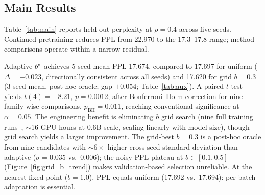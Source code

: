 \begin{table}[t]
\centering
\small
\setlength{\tabcolsep}{3pt}
\caption{Main comparison: held-out PPL ($\downarrow$) at $\rho{=}0.4$, 1 content epoch.
Adaptive and Uniform: 5-seed means (seeds 42, 123, 456, 789, 234); ESS-only and Random: 3-seed means (seeds 42, 123, 456); Permuted: single seed (42).
Adaptive uses $\tau{=}0.7$, $\nmin{=}2$.
Permuted randomly shuffles $q$-scores across samples, destroying provenance signal while preserving weight non-uniformity ($\Delta{=}{+}0.225$).}
\label{tab:main}
\end{table}

\subsection{Main Results}
\label{sec:main-results}

Table~\ref{tab:main} reports held-out perplexity at $\rho = 0.4$ across five seeds.
Continued pretraining reduces PPL from 22.970 to the 17.3--17.8 range; method comparisons operate within a narrow residual.

Adaptive $b^*$ achieves 5-seed mean PPL 17.674, compared to 17.697 for uniform ($\Delta{=}{-}0.023$, directionally consistent across all seeds) and 17.620 for grid $b{=}0.3$ (3-seed mean, post-hoc oracle; gap $+$0.054; Table~\ref{tab:aux}).
A paired $t$-test yields $t(4){=}{-}8.21$, $p{=}0.0012$; after Bonferroni--Holm correction for nine family-wise comparisons, $p_{\mathrm{BH}}{=}0.011$, reaching conventional significance at $\alpha{=}0.05$.
The engineering benefit is eliminating $b$ grid search (nine full training runs~\citep{drayson2025detection}, ${\sim}$16 GPU-hours at 0.6B scale, scaling linearly with model size), though grid search yields a larger improvement.
The grid-best $b{=}0.3$ is a post-hoc oracle from nine candidates with ${\sim}6{\times}$ higher cross-seed standard deviation than adaptive ($\sigma{=}0.035$ vs.\ $0.006$); the noisy PPL plateau at $b \in [0.1, 0.5]$ (Figure~\ref{fig:grid_b_trend}) makes validation-based selection unreliable.
At the nearest fixed point ($b{=}1.0$), PPL equals uniform (17.692 vs.\ 17.694): per-batch adaptation is essential.

